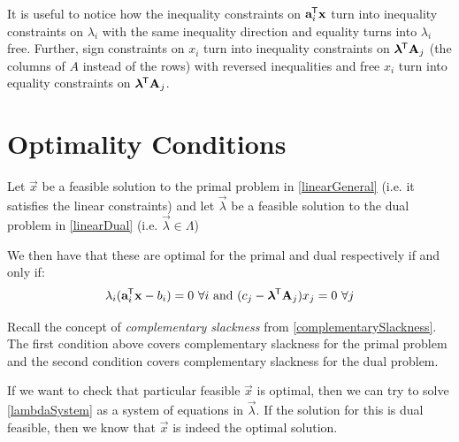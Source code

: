 \documentclass[../main.tex]{subfiles}
\begin{document}
\begin{remark}
  It is useful to notice how the inequality constraints on $\mathbf{\bm{a}}^{{\mkern-1.5mu\mathsf{T}}}_i \mathbf{\bm{x}}$ turn into inequality constraints on $\lambda_i$ with the same inequality direction and equality turns into $\lambda_i$ free.
  Further, sign constraints on $x_i$ turn into inequality constraints on $\mathbf{\bm{\lambda}}^{{\mkern-1.5mu\mathsf{T}}} \mathbf{\bm{A}}_j$ (the columns of $A$ instead of the rows) with reversed inequalities and free $x_i$ turn into equality constraints on $\mathbf{\bm{\lambda}}^{{\mkern-1.5mu\mathsf{T}}} \mathbf{\bm{A}}_j$.
\end{remark}
\section{Optimality Conditions}
\begin{theorem}
  Let $\vec{x}$ be a feasible solution to the primal problem in \cref{linearGeneral} (i.e. it satisfies the linear constraints) and let $\vec{\lambda}$ be a feasible solution to the dual problem in \cref{linearDual} (i.e. $\vec{\lambda} \in \Lambda$) \label{optimalityConds}

  We then have that these are optimal for the primal and dual respectively if and only if:
  \begin{equation}
    \lambda_i (\mathbf{\bm{a}}^{{\mkern-1.5mu\mathsf{T}}}_i \mathbf{\bm{x}} - b_i) = 0\ \forall i \text{ and } (c_j - \mathbf{\bm{\lambda}}^{{\mkern-1.5mu\mathsf{T}}}\mathbf{\bm{A}}_j)x_j = 0\ \forall j \label{lambdaSystem}
  \end{equation}
\end{theorem}
\begin{remark}
  Recall the concept of \textit{complementary slackness} from \cref{complementarySlackness}.
  The first condition above covers complementary slackness for the primal problem and the second condition covers complementary slackness for the dual problem.
\end{remark}
\begin{remark}[Use]
  If we want to check that particular feasible $\vec{x}$ is optimal, then we can try to solve \cref{lambdaSystem} as a system of equations in $\vec{\lambda}$.
  If the solution for this is dual feasible, then we know that $\vec{x}$ is indeed the optimal solution.
\end{remark}
\end{document}
